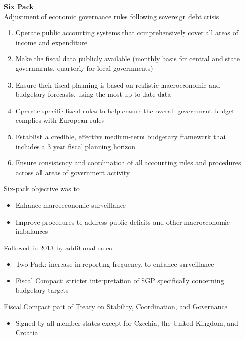 \documentclass{beamer}
\begin{document}
\begin{frame}
  \textbf{Six Pack}\\
  Adjustment of economic governance rules following sovereign debt crisis
\begin{enumerate}
  \item Operate public accounting systems that comprehensively cover all areas of income and expenditure
  \item Make the fiscal data publicly available (monthly basis for central and state governments, quarterly for local governments)
  \item Ensure their fiscal planning is based on realistic macroeconomic and budgetary forecasts, using the most up-to-date data
  \item Operate specific fiscal rules to help ensure the overall government budget complies with European rules
  \item Establish a credible, effective medium-term budgetary framework that includes a 3 year fiscal planning horizon
  \item Ensure consistency and coordination of all accounting rules and procedures across all areas of government activity
\end{enumerate}
\end{frame}

\begin{frame}
  Six-pack objective was to 
  \begin{itemize}
  \item Enhance marcoeconomic surveillance
  \item Improve procedures to address public deficits and other macroeconomic imbalances 
  \end{itemize}
  \medskip
  Followed in 2013 by additional rules
  \begin{itemize}
    \item Two Pack: increase in reporting frequency, to enhance surveillance
    \item Fiscal Compact: stricter interpretation of SGP specifically concerning budgetary targets
  \end{itemize}
  \medskip
  Fiscal Compact part of Treaty on Stability, Coordination, and Governance
  \begin{itemize}
    \item Signed by all member states except for Czechia, the United Kingdom, and Croatia
  \end{itemize}
\end{frame}
\end{document}
